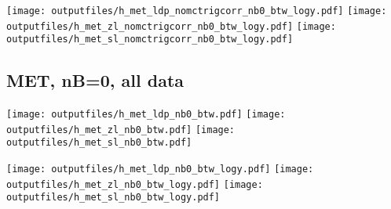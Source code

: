 \documentclass[11pt]{article}
\begin{document}
    \noindent
    \texttt{[image: outputfiles/h\_met\_ldp\_nomctrigcorr\_nb0\_btw\_logy.pdf]}
    \texttt{[image: outputfiles/h\_met\_zl\_nomctrigcorr\_nb0\_btw\_logy.pdf]}
    \texttt{[image: outputfiles/h\_met\_sl\_nomctrigcorr\_nb0\_btw\_logy.pdf]}


    \subsection{ MET, nB=0, all data}

    \noindent
    \texttt{[image: outputfiles/h\_met\_ldp\_nb0\_btw.pdf]}
    \texttt{[image: outputfiles/h\_met\_zl\_nb0\_btw.pdf]}
    \texttt{[image: outputfiles/h\_met\_sl\_nb0\_btw.pdf]}

    \noindent
    \texttt{[image: outputfiles/h\_met\_ldp\_nb0\_btw\_logy.pdf]}
    \texttt{[image: outputfiles/h\_met\_zl\_nb0\_btw\_logy.pdf]}
    \texttt{[image: outputfiles/h\_met\_sl\_nb0\_btw\_logy.pdf]}







\end{document}

